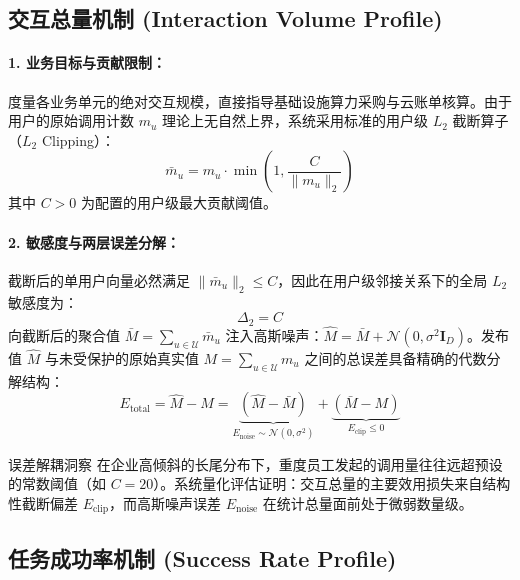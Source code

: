 \subsection{交互总量机制 (Interaction Volume Profile)}
\paragraph{1. 业务目标与贡献限制：}
度量各业务单元的绝对交互规模，直接指导基础设施算力采购与云账单核算。由于用户的原始调用计数 $m_u$ 理论上无自然上界，系统采用标准的用户级 $L_2$ 截断算子（$L_2$ Clipping）：
\begin{equation}
  \bar{m}_u = m_u \cdot \min\left(1, \frac{C}{\|m_u\|_2}\right)
\end{equation}
其中 $C > 0$ 为配置的用户级最大贡献阈值。

\paragraph{2. 敏感度与两层误差分解：}
截断后的单用户向量必然满足 $\|\bar{m}_u\|_2 \le C$，因此在用户级邻接关系下的全局 $L_2$ 敏感度为：
\begin{equation}
  \Delta_2 = C
\end{equation}
向截断后的聚合值 $\bar{M} = \sum_{u \in \mathcal{U}} \bar{m}_u$ 注入高斯噪声：$\hat{M} = \bar{M} + \mathcal{N}(0, \sigma^2 \mathbf{I}_D)$。发布值 $\hat{M}$ 与未受保护的原始真实值 $M = \sum_{u \in \mathcal{U}} m_u$ 之间的总误差具备精确的代数分解结构：
\begin{equation}
  \label{eq:volume_error_decomp}
  E_{\text{total}} = \hat{M} - M = \underbrace{(\hat{M} - \bar{M})}_{E_{\text{noise}} \sim \mathcal{N}(0, \sigma^2)} + \underbrace{(\bar{M} - M)}_{E_{\text{clip}} \le 0}
\end{equation}
\begin{techbox}{误差解耦洞察}
在企业高倾斜的长尾分布下，重度员工发起的调用量往往远超预设的常数阈值（如 $C=20$）。系统量化评估证明：交互总量的主要效用损失来自结构性截断偏差 $E_{\text{clip}}$，而高斯噪声误差 $E_{\text{noise}}$ 在统计总量面前处于微弱数量级。
\end{techbox}

\subsection{任务成功率机制 (Success Rate Profile)}
